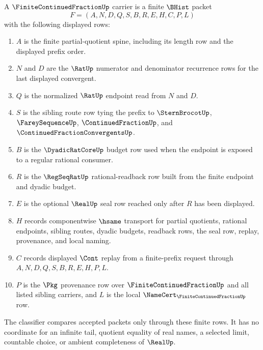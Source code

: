 \begin{definition}
\label{def:finite-continued-fraction-carrier}
A $\FiniteContinuedFractionUp$ carrier is a finite $\BHist$ packet
$$
F=(A,N,D,Q,S,B,R,E,H,C,P,L)
$$
with the following displayed rows:
\begin{enumerate}
\item $A$ is the finite partial-quotient spine, including its length row and the displayed prefix order.
\item $N$ and $D$ are the $\RatUp$ numerator and denominator recurrence rows for the last displayed convergent.
\item $Q$ is the normalized $\RatUp$ endpoint read from $N$ and $D$.
\item $S$ is the sibling route row tying the prefix to $\SternBrocotUp$, $\FareySequenceUp$, $\ContinuedFractionUp$, and $\ContinuedFractionConvergentsUp$.
\item $B$ is the $\DyadicRatCoreUp$ budget row used when the endpoint is exposed to a regular rational consumer.
\item $R$ is the $\RegSeqRatUp$ rational-readback row built from the finite endpoint and dyadic budget.
\item $E$ is the optional $\RealUp$ seal row reached only after $R$ has been displayed.
\item $H$ records componentwise $\hsame$ transport for partial quotients, rational endpoints, sibling routes, dyadic budgets, readback rows, the seal row, replay, provenance, and local naming.
\item $C$ records displayed $\Cont$ replay from a finite-prefix request through $A,N,D,Q,S,B,R,E,H,P,L$.
\item $P$ is the $\Pkg$ provenance row over $\FiniteContinuedFractionUp$ and all listed sibling carriers, and $L$ is the local $\NameCert_{\FiniteContinuedFractionUp}$ row.
\end{enumerate}
The classifier compares accepted packets only through these finite rows. It has no coordinate for an infinite tail, quotient equality of real names, a selected limit, countable choice, or ambient completeness of $\RealUp$.
\end{definition}

